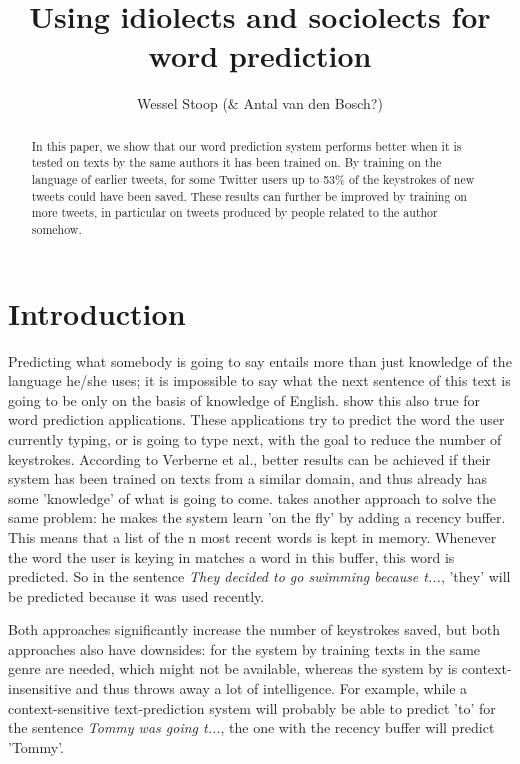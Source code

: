 \documentclass[11pt]{article}
\title{Using idiolects and sociolects for word prediction}
\author{Wessel Stoop (\& Antal van den Bosch?)}
\date{}
\begin{document}
\maketitle

\begin{abstract}
In this paper, we show that our word prediction system performs better when it is tested on texts by the same authors it has been trained on. By training on the language of earlier tweets, for some Twitter users up to 53\% of the keystrokes of new tweets could have been saved. These results can further be improved by training on more tweets, in particular on tweets produced by people related to the author somehow.
\end{abstract}

\section{Introduction}
Predicting what somebody is going to say entails more than just knowledge of the language he/she uses; it is impossible to say what the next sentence of this text is going to be only on the basis of knowledge of English.  show this also true for word prediction applications. These applications try to predict the word the user currently typing, or is going to type next, with the goal to reduce the number of keystrokes. According to Verberne et al., better results can be achieved if their system has been trained on texts from a similar domain, and thus already has some 'knowledge' of what is going to come.  takes another approach to solve the same problem: he makes the system learn 'on the fly' by adding a recency buffer. This means that a list of the n most recent words is kept in memory. Whenever the word the user is keying in matches a word in this buffer, this word is predicted. So in the sentence \emph{They decided to go swimming because t...}, 'they' will be predicted because it was used recently.

Both approaches significantly increase the number of keystrokes saved, but both approaches also have downsides: for the system by  training texts in the same genre are needed, which might not be available, whereas the system by  is context-insensitive and thus throws away a lot of intelligence. For example, while a context-sensitive text-prediction system will probably be able to predict 'to' for the sentence \emph{Tommy was going t...}, the one with the recency buffer will predict 'Tommy'.
\end{document}
